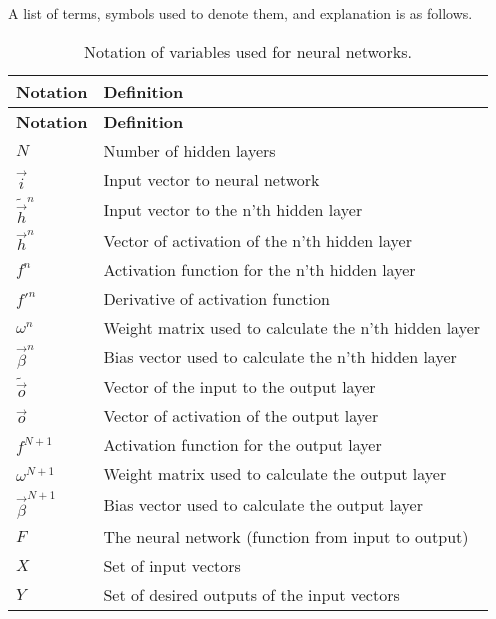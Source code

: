 \documentclass[../dissertation.tex]{subfiles}
\begin{document}
A list of terms, symbols used to denote them, and explanation is as follows.

\begin{xltabular}{\linewidth}{ l | X }
    \caption{Notation of variables used for neural networks.}
    \label{tab:nnVarDesc}
    \\
    \toprule
    \textbf{\normalsize Notation}   & \textbf{\normalsize Definition} \\
    \midrule
    \endfirsthead

    \toprule
    \textbf{\normalsize Notation}   & \textbf{\normalsize Definition} \\
    \midrule
    \endhead
    \bottomrule
    \endfoot

    $N$                 & Number of hidden layers                               \\
    $\vec{i}$           & Input vector to neural network                        \\
    $\tilde{\vec{h}}^n$ & Input vector to the n'th hidden layer                 \\
    $\vec{h}^n$         & Vector of activation of the n'th hidden layer         \\
    $f^n$               & Activation function for the n'th hidden layer         \\
    $f'^{n}$            & Derivative of activation function                     \\
    $\omega^n$          & Weight matrix used to calculate the n'th hidden layer \\
    $\vec{\beta}^n$     & Bias vector used to calculate the n'th hidden layer   \\
    $\tilde{\vec{o}}$   & Vector of the input to the output layer               \\
    $\vec{o}$           & Vector of activation of the output layer              \\
    $f^{N+1}$           & Activation function for the output layer              \\
    $\omega^{N+1}$      & Weight matrix used to calculate the output layer      \\
    $\vec{\beta}^{N+1}$ & Bias vector used to calculate the output layer        \\
    $F$                 & The neural network (function from input to output)    \\
    $X$                 & Set of input vectors                                  \\
    $Y$                 & Set of desired outputs of the input vectors           \\

\end{xltabular}
\end{document}
